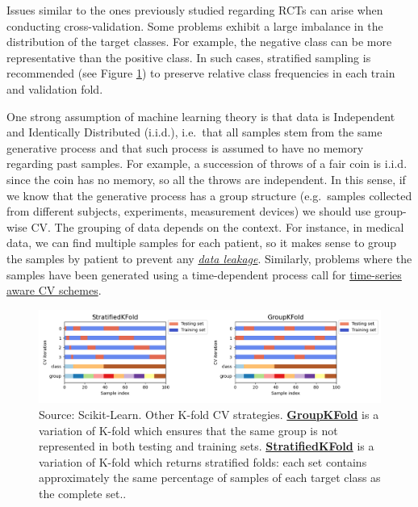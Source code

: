 \documentclass[
]{book}
\begin{document}
Issues similar to the ones previously studied regarding RCTs can arise when conducting cross-validation. Some problems exhibit a large imbalance in the distribution of the target classes. For example, the negative class can be more representative than the positive class. In such cases, stratified sampling is recommended (see Figure \ref{fig:k-fold-strategies}) to preserve relative class frequencies in each train and validation fold.

One strong assumption of machine learning theory is that data is Independent and Identically Distributed (i.i.d.), i.e.~that all samples stem from the same generative process and that such process is assumed to have no memory regarding past samples. For example, a succession of throws of a fair coin is i.i.d. since the coin has no memory, so all the throws are independent. In this sense, if we know that the generative process has a group structure (e.g.~samples collected from different subjects, experiments, measurement devices) we should use group-wise CV. The grouping of data depends on the context. For instance, in medical data, we can find multiple samples for each patient, so it makes sense to group the samples by patient to prevent any \href{https://scikit-learn.org/0.24/common_pitfalls.html\#data-leakage}{\emph{data leakage}}. Similarly, problems where the samples have been generated using a time-dependent process call for \href{https://scikit-learn.org/stable/modules/cross_validation.html\#timeseries-cv}{time-series aware CV schemes}.



\begin{figure}

{\centering \includegraphics[width=1\linewidth]{Figures/kfold-strategies} 

}

\caption{Source: Scikit-Learn. Other K-fold CV strategies. \href{https://scikit-learn.org/stable/modules/cross_validation.html\#group-k-fold}{\textbf{GroupKFold}} is a variation of K-fold which ensures that the same group is not represented in both testing and training sets. \href{https://scikit-learn.org/stable/modules/cross_validation.html\#stratified-k-fold}{\textbf{StratifiedKFold}} is a variation of K-fold which returns stratified folds: each set contains approximately the same percentage of samples of each target class as the complete set..}\label{fig:k-fold-strategies}
\end{figure}
\end{document}
